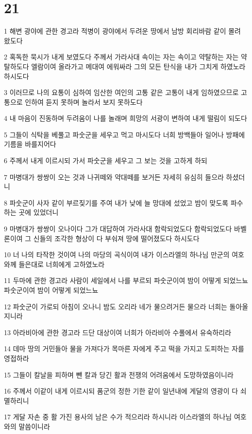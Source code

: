 \chapter{21}

\par 1 해변 광야에 관한 경고라 적병이 광야에서 두려운 땅에서 남방 회리바람 같이 몰려 왔도다
\par 2 혹독한 묵시가 내게 보였도다 주께서 가라사대 속이는 자는 속이고 약탈하는 자는 약탈하도다 엘람이여 올라가고 메대여 에워싸라 그의 모든 탄식을 내가 그치게 하였노라 하시도다
\par 3 이러므로 나의 요통이 심하여 임산한 여인의 고통 같은 고통이 내게 임하였으므로 고통으로 인하여 듣지 못하며 놀라서 보지 못하도다
\par 4 내 마음이 진동하며 두려움이 나를 놀래며 희망의 서광이 변하여 내게 떨림이 되도다
\par 5 그들이 식탁을 베풀고 파숫군을 세우고 먹고 마시도다 너희 방백들아 일어나 방패에 기름을 바를지어다
\par 6 주께서 내게 이르시되 가서 파숫군을 세우고 그 보는 것을 고하게 하되
\par 7 마병대가 쌍쌍이 오는 것과 나귀떼와 약대떼를 보거든 자세히 유심히 들으라 하셨더니
\par 8 파숫군이 사자 같이 부르짖기를 주여 내가 낮에 늘 망대에 섰었고 밤이 맞도록 파수하는 곳에 있었더니
\par 9 마병대가 쌍쌍이 오나이다 그가 대답하여 가라사대 함락되었도다 함락되었도다 바벨론이여 그 신들의 조각한 형상이 다 부숴져 땅에 떨어졌도다 하시도다
\par 10 너 나의 타작한 것이여 나의 마당의 곡식이여 내가 이스라엘의 하나님 만군의 여호와께 들은대로 너희에게 고하였노라
\par 11 두마에 관한 경고라 사람이 세일에서 나를 부르되 파숫군이여 밤이 어떻게 되었느뇨 파숫군이여 밤이 어떻게 되었느뇨
\par 12 파숫군이 가로되 아침이 오나니 밤도 오리라 네가 물으려거든 물으라 너희는 돌아올지니라
\par 13 아라비아에 관한 경고라 드단 대상이여 너희가 아라비아 수풀에서 유숙하리라
\par 14 데마 땅의 거민들아 물을 가져다가 목마른 자에게 주고 떡을 가지고 도피하는 자를 영접하라
\par 15 그들이 칼날을 피하며 뺀 칼과 당긴 활과 전쟁의 어려움에서 도망하였음이니라
\par 16 주께서 이같이 내게 이르시되 품군의 정한 기한 같이 일년내에 게달의 영광이 다 쇠멸하리니
\par 17 게달 자손 중 활 가진 용사의 남은 수가 적으리라 하시니라 이스라엘의 하나님 여호와의 말씀이니라

